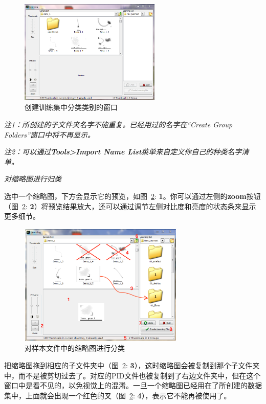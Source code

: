 \documentclass[12pt]{article}
\begin{document}
\begin{figure}[!ht]
\centering
\includegraphics[width=0.6\textwidth]{LearningWindow.png}
\caption{创建训练集中分类类别的窗口}
\label{fig: CreateGroupsWindow}
\end{figure} 

{\color{blue}\textit{注1：所创建的子文件夹名字不能重复。已经用过的名字在“Create Group Folders”窗口中将不再显示。}}

{\color{blue}\textit{注2：可以通过\textbf{Tools>Import Name List}菜单来自定义你自己的种类名字清单。}}

\textit{对缩略图进行归类}

选中一个缩略图，下方会显示它的预览，如图~\ref{fig: ThumbnailsSorting}: {\color{red}\textbf{1}}。你可以通过左侧的\textbf{zoom}按钮（图~\ref{fig: ThumbnailsSorting}: {\color{red}\textbf{2}}）将预览结果放大，还可以通过调节左侧对比度和亮度的状态条来显示更多细节。

\begin{figure}[!ht]
\centering
\includegraphics[width=0.7\textwidth]{ThumbnailsSorting.eps}
\caption{对样本文件中的缩略图进行分类}
\label{fig: ThumbnailsSorting}
\end{figure} 

把缩略图拖到相应的子文件夹中（图~\ref{fig: ThumbnailsSorting}: {\color{red}\textbf{3}}），这时缩略图会被复制到那个子文件夹中，而不是被剪切过去了。对应的PID文件也被复制到了右边文件夹中，但在这个窗口中是看不见的，以免视觉上的混淆。一旦一个缩略图已经用在了所创建的数据集中，上面就会出现一个红色的叉（图~\ref{fig: ThumbnailsSorting}: {\color{red}\textbf{4}}），表示它不能再被使用了。
\end{document}
